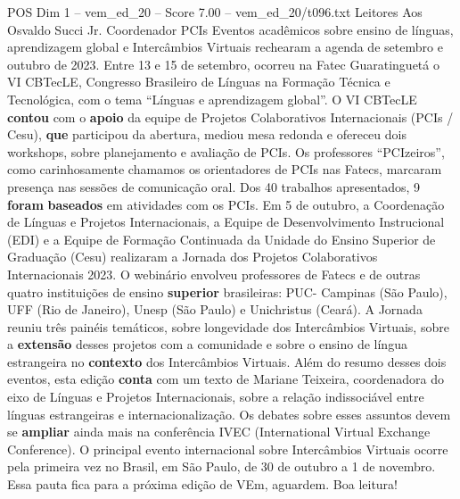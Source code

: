 \begin{textsample}{POS Dim 1 – vem\_ed\_20 – Score 7.00 – vem\_ed\_20/t096.txt}  \label{ex:f1_pos_111}
Leitores Aos Osvaldo Succi Jr.
Coordenador PCIs Eventos acadêmicos sobre ensino de línguas, aprendizagem global e Intercâmbios Virtuais rechearam a agenda de setembro e outubro de 2023.
Entre 13 e 15 de setembro, ocorreu na Fatec Guaratinguetá o VI CBTecLE, Congresso Brasileiro de Línguas na Formação Técnica e Tecnológica, com o tema “Línguas e aprendizagem global”.
O VI CBTecLE \textbf{contou} com o \textbf{apoio} da equipe de Projetos Colaborativos Internacionais (PCIs / Cesu), \textbf{que} participou da abertura, mediou mesa redonda e ofereceu dois workshops, sobre planejamento e avaliação de PCIs.
Os professores “PCIzeiros”, como carinhosamente chamamos os orientadores de PCIs nas Fatecs, marcaram presença nas sessões de comunicação oral.
Dos 40 trabalhos apresentados, 9 \textbf{foram} \textbf{baseados} em atividades com os PCIs.
Em 5 de outubro, a Coordenação de Línguas e Projetos Internacionais, a Equipe de Desenvolvimento Instrucional (EDI) e a Equipe de Formação Continuada da Unidade do Ensino Superior de Graduação (Cesu) realizaram a Jornada dos Projetos Colaborativos Internacionais 2023.
O webinário envolveu professores de Fatecs e de outras quatro instituições de ensino \textbf{superior} brasileiras: PUC- Campinas (São Paulo), UFF (Rio de Janeiro), Unesp (São Paulo) e Unichristus (Ceará).
A Jornada reuniu três painéis temáticos, sobre longevidade dos Intercâmbios Virtuais, sobre a \textbf{extensão} desses projetos com a comunidade e sobre o ensino de língua estrangeira no \textbf{contexto} dos Intercâmbios Virtuais.
Além do resumo desses dois eventos, esta edição \textbf{conta} com um texto de Mariane Teixeira, coordenadora do eixo de Línguas e Projetos Internacionais, sobre a relação indissociável entre línguas estrangeiras e internacionalização.
Os debates sobre esses assuntos devem se \textbf{ampliar} ainda mais na conferência IVEC (International Virtual Exchange Conference).
O principal evento internacional sobre Intercâmbios Virtuais ocorre pela primeira vez no Brasil, em São Paulo, de 30 de outubro a 1 de novembro.
Essa pauta fica para a próxima edição de VEm, aguardem.
Boa leitura!

\end{textsample}

